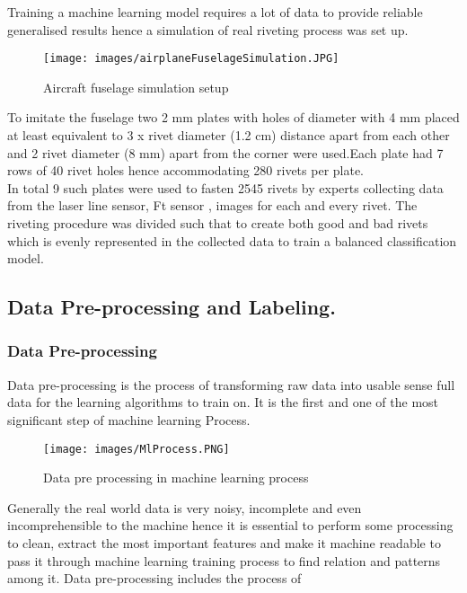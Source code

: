 \documentclass{article}
\begin{document}
Training a machine learning model requires a lot of data to provide reliable generalised results hence a simulation of real riveting process was set up.\\

\begin{figure}[H]
        \centering
        \texttt{[image: images/airplaneFuselageSimulation.JPG]}
        \caption{Aircraft fuselage simulation setup}
         \label{fig:Aircraftfuselagesimulationsetup}
        \end{figure}

To imitate the fuselage two 2 mm plates with holes of diameter with 4 mm placed at least equivalent to 3 x rivet diameter (1.2 cm) distance apart from  each  other and 2 rivet diameter (8 mm) apart from the corner were used.Each plate had 7 rows of 40 rivet holes hence accommodating 280 rivets per plate.\\

In total 9 such plates were used to fasten 2545 rivets by experts collecting data from the laser line sensor, Ft sensor , images for each and every rivet. The riveting procedure was divided such that to create both good and bad rivets which is evenly represented in the collected data to train a balanced classification model.\\

\subsection{Data Pre-processing and Labeling.}

\subsubsection{Data Pre-processing}

Data pre-processing is the process of transforming raw data into usable sense full data for the learning algorithms to train on. It is the first and one of the most significant step of machine learning Process.\\

\begin{figure}[H]
    \centering
    \texttt{[image: images/MlProcess.PNG]}
    \caption{Data pre processing in machine learning process}
    
    \author{David Chappel}
    \label{fig: machineLearningProcess}
\end{figure}

Generally the real world data is very noisy, incomplete and even incomprehensible to the machine hence it is essential to perform some processing to clean, extract the most important features and make it machine readable to pass it through machine learning training process to find relation and patterns among it. Data pre-processing includes the process of \cite{Kotsiantis06datapreprocessing}
\end{document}
